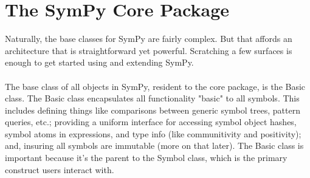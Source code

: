 \documentclass[11pt,a4paper,oneside]{report}
\begin{document}
 \section*{The SymPy Core Package}
Naturally, the base classes for SymPy are fairly complex. But that affords an architecture that is straightforward yet powerful. Scratching a few surfaces is enough to get started using and extending SymPy.\\\\
The base class of all objects in SymPy, resident to the core package, is the Basic class. The Basic class encapsulates all functionality "basic" to all symbols. This includes defining things like comparisons between generic symbol trees, pattern queries, etc.; providing a uniform interface for accessing symbol object hashes, symbol atoms in expressions, and type info (like communitivity and positivity); and, insuring all symbols are immutable (more on that later). The Basic class is important because it's the parent to the Symbol class, which is the primary construct users interact with.
\end{document}
